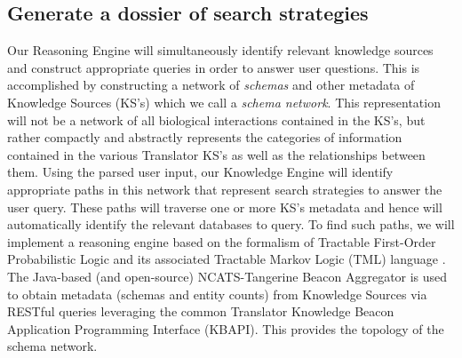 \documentclass[11pt,notitlepage]{article}
\begin{document}
\subsection{Generate a dossier of search strategies}
Our Reasoning Engine will simultaneously identify relevant knowledge sources and construct appropriate queries in order to answer user questions. This is accomplished by constructing a network of \textit{schemas} and other metadata of Knowledge Sources (KS's) which we call a \textit{schema network}. This representation will not be a network of all biological interactions contained in the KS's, but rather compactly and abstractly represents the categories of information contained in the various Translator KS's as well as the relationships between them. Using the parsed user input, our Knowledge Engine will identify appropriate paths in this network that represent search strategies to answer the user query. These paths will traverse one or more KS's metadata and hence will automatically identify the relevant databases to query. To find such paths, we will implement a reasoning engine based on the formalism of Tractable First-Order Probabilistic Logic and its associated Tractable Markov Logic (TML) language \citet{Domingos:2012wi}. The Java-based (and open-source) NCATS-Tangerine Beacon Aggregator is used to obtain metadata (schemas and entity counts) from Knowledge Sources via RESTful queries leveraging the common Translator Knowledge Beacon Application Programming Interface (KBAPI). This provides the topology of the schema network. 
\end{document}
